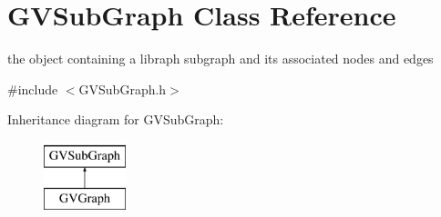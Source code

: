 \hypertarget{class_g_v_sub_graph}{\section{\-G\-V\-Sub\-Graph \-Class \-Reference}
\label{class_g_v_sub_graph}
}


the object containing a libraph subgraph and its associated nodes and edges  




{\ttfamily \#include $<$\-G\-V\-Sub\-Graph.\-h$>$}

\-Inheritance diagram for \-G\-V\-Sub\-Graph\-:\begin{figure}[H]
\begin{center}
\leavevmode
\includegraphics[height=2.000000cm]{class_g_v_sub_graph}
\end{center}
\end{figure}
